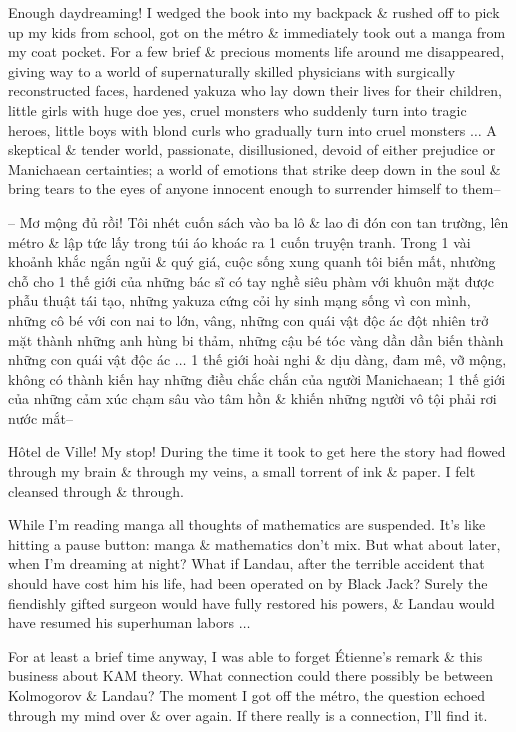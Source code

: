\documentclass{article}
\begin{document}
\begin{enumerate}
	Enough daydreaming! I wedged the book into my backpack \& rushed off to pick up my kids from school, got on the m\'etro \& immediately took out a manga from my coat pocket. For a few brief \& precious moments life around me disappeared, giving way to a world of supernaturally skilled physicians with surgically reconstructed faces, hardened yakuza who lay down their lives for their children, little girls with huge doe yes, cruel monsters who suddenly turn into tragic heroes, little boys with blond curls who gradually turn into cruel monsters $\ldots$ A skeptical \& tender world, passionate, disillusioned, devoid of either prejudice or Manichaean certainties; a world of emotions that strike deep down in the soul \& bring tears to the eyes of anyone innocent enough to surrender himself to them--

	-- Mơ mộng đủ rồi! Tôi nhét cuốn sách vào ba lô \& lao đi đón con tan trường, lên m\'etro \& lập tức lấy trong túi áo khoác ra 1 cuốn truyện tranh. Trong 1 vài khoảnh khắc ngắn ngủi \& quý giá, cuộc sống xung quanh tôi biến mất, nhường chỗ cho 1 thế giới của những bác sĩ có tay nghề siêu phàm với khuôn mặt được phẫu thuật tái tạo, những yakuza cứng cỏi hy sinh mạng sống vì con mình, những cô bé với con nai to lớn, vâng, những con quái vật độc ác đột nhiên trở mặt thành những anh hùng bi thảm, những cậu bé tóc vàng dần dần biến thành những con quái vật độc ác $\ldots$ 1 thế giới hoài nghi \& dịu dàng, đam mê, vỡ mộng, không có thành kiến hay những điều chắc chắn của người Manichaean; 1 thế giới của những cảm xúc chạm sâu vào tâm hồn \& khiến những người vô tội phải rơi nước mắt--

	H\^otel de Ville! My stop! During the time it took to get here the story had flowed through my brain \& through my veins, a small torrent of ink \& paper. I felt cleansed through \& through.

	While I'm reading manga all thoughts of mathematics are suspended. It's like hitting a pause button: manga \& mathematics don't mix. But what about later, when I'm dreaming at night? What if {\sc Landau}, after the terrible accident that should have cost him his life, had been operated on by {\sc Black Jack}? Surely the fiendishly gifted surgeon would have fully restored his powers, \& {\sc Landau} would have resumed his superhuman labors $\ldots$

	For at least a brief time anyway, I was able to forget {\sc\'Etienne}'s remark \& this business about KAM theory. What connection could there possibly be between {\sc Kolmogorov \& Landau}? The moment I got off the m\'etro, the question echoed through my mind over \& over again. If there really is a connection, I'll find it.


\end{enumerate}
\end{document}
